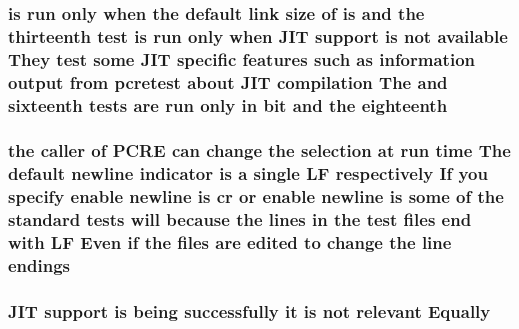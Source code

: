 \subsubsection[{\texorpdfstring{eighteenth}{eighteenth}}]{ {\bf is} {\bf run} only when the {\bf default} link {\bf size} {\bf of} {\bf is} and the thirteenth test {\bf is} {\bf run} only when J\+IT {\bf support} {\bf is} {\bf not} {\bf available} They test some J\+IT specific {\bf features} such {\bf as} information {\bf output} {\bf from} {\bf pcretest} about J\+IT {\bf compilation} The and sixteenth {\bf tests} {\bf are} {\bf run} only {\bf in} {\bf bit} and the eighteenth}\hypertarget{README_8txt_a74a955233400619e5edff29fa3ebae5f}{}\label{README_8txt_a74a955233400619e5edff29fa3ebae5f}
\subsubsection[{\texorpdfstring{endings}{endings}}]{\setlength{\rightskip}{0pt plus 5cm}the caller {\bf of} {\bf P\+C\+RE} {\bf can} change the selection at {\bf run} {\bf time} The {\bf default} {\bf newline} indicator {\bf is} {\bf a} single {\bf LF} {\bf respectively} If you specify enable {\bf newline} {\bf is} {\bf cr} {\bf or} enable {\bf newline} {\bf is} some {\bf of} the standard {\bf tests} will because the {\bf lines} {\bf in} the test {\bf files} {\bf end} {\bf with} {\bf LF} Even {\bf if} the {\bf files} {\bf are} edited {\bf to} change the {\bf line} endings}\hypertarget{README_8txt_a08ff118b0cfdd5d267021aa3937a5dbd}{}\label{README_8txt_a08ff118b0cfdd5d267021aa3937a5dbd}
\subsubsection[{\texorpdfstring{Equally}{Equally}}]{ J\+IT {\bf support} {\bf is} being successfully {\bf it} {\bf is} {\bf not} relevant Equally}\hypertarget{README_8txt_a7bd075813a24719a35805db8afec1538}{}\label{README_8txt_a7bd075813a24719a35805db8afec1538}
